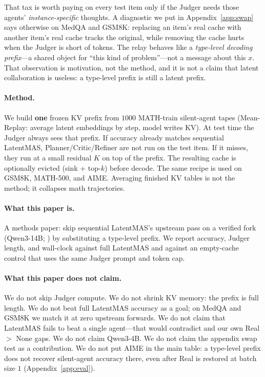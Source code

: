 \documentclass[11pt]{article}
\begin{document}
That tax is worth paying on every test item only if the Judger needs
those agents' \emph{instance-specific} thoughts.
A diagnostic we put in Appendix~\ref{app:swap} says otherwise on MedQA
and GSM8K: replacing an item's real cache with another item's real cache
tracks the original, while removing the cache hurts when the Judger is
short of tokens.
The relay behaves like a \emph{type-level decoding prefix}---a shared
object for ``this kind of problem''---not a message about this $x$.
That observation is motivation, not the method, and it is not a claim
that latent collaboration is useless: a type-level prefix is still a
latent prefix.

\paragraph{Method.}
We build \textbf{one} frozen KV prefix from $1000$ MATH-train silent-agent
tapes (Mean-Replay: average latent embeddings by step, model writes KV).
At test time the Judger always sees that prefix.
If accuracy already matches sequential LatentMAS, Planner/Critic/Refiner
are not run on the test item.
If it misses, they run at a small residual $K$ on top of the prefix.
The resulting cache is optionally evicted (sink + top-$k$) before decode.
The same recipe is used on GSM8K, MATH-500, and AIME.
Averaging finished KV tables is not the method; it collapses math
trajectories.

\paragraph{What this paper is.}
A methods paper: skip sequential LatentMAS's upstream pass on a verified
fork (Qwen3-14B; \citealp{qwen3}) by substituting a type-level prefix.
We report accuracy, Judger length, and wall-clock against full LatentMAS
and against an empty-cache control that uses the same Judger prompt and
token cap.

\paragraph{What this paper does not claim.}
We do not skip Judger compute.
We do not shrink KV memory: the prefix is full length.
We do not beat full LatentMAS accuracy as a goal; on MedQA and GSM8K we
match it at zero upstream forwards.
We do not claim that LatentMAS fails to beat a single agent---that would
contradict \citet{zou2025latentmas} and our own Real $>$ None gaps.
We do not claim Qwen3-4B.
We do not claim the appendix swap test as a contribution.
We do not put AIME in the main table: a type-level prefix does not recover
silent-agent accuracy there, even after Real is restored at batch size $1$
(Appendix~\ref{app:eval}).
\end{document}
